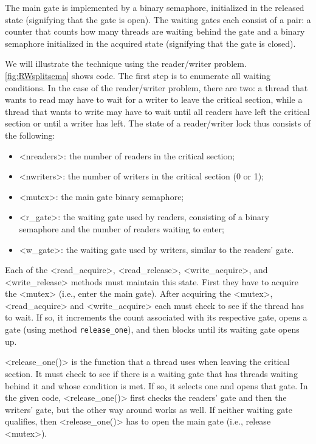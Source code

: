 \documentclass{report}
\begin{document}
The main gate is implemented by a binary semaphore, initialized in the
released state (signifying that the gate is open).
The waiting gates each consist of a pair: a counter that counts how many
threads are waiting behind the gate and a binary semaphore initialized
in the acquired state (signifying that the gate is closed).

We will illustrate the technique using the reader/writer problem.
\autoref{fig:RWsplitsema} shows code.
The first step is to enumerate all waiting conditions.
In the case of the reader/writer
problem, there are two: a thread that wants to read may have to wait for a
writer to leave the critical section, while a thread that wants to write may
have to wait until all readers have left the critical section or until a writer has left.
%
The state of a reader/writer lock thus consists of the following:
\begin{itemize}
\item <{nreaders}>: the number of readers in the critical section;
\item <{nwriters}>: the number of writers in the critical section (0 or 1);
\item <{mutex}>: the main gate binary semaphore;
\item <{r_gate}>: the waiting gate used by readers, consisting of a binary semaphore and the number of readers waiting to enter;
\item <{w_gate}>: the waiting gate used by writers, similar to the readers' gate.
\end{itemize}

Each of the
<{read_acquire}>, <{read_release}>,
<{write_acquire}>, and <{write_release}> methods must maintain
this state.
First they have to acquire the <{mutex}>
(i.e., enter the main gate).
After acquiring the <{mutex}>,
<{read_acquire}> and <{write_acquire}> each must check to see
if the thread has to wait.
If so, it increments the count associated with its respective gate,
opens a gate (using method \texttt{release\_one}), and then blocks until
its waiting gate opens up.

<{release_one()}> is the function that a thread uses when leaving
the critical section.  It must check to see if there is a waiting gate
that has threads waiting behind it and whose condition is met.
If so, it selects one and opens that gate.  In the given code,
<{release_one()}> first checks the readers' gate and then the
writers' gate, but the other way around works as well.
If neither waiting gate qualifies, then <{release_one()}> 
has to open the main gate (i.e., release <{mutex}>).
\end{document}
